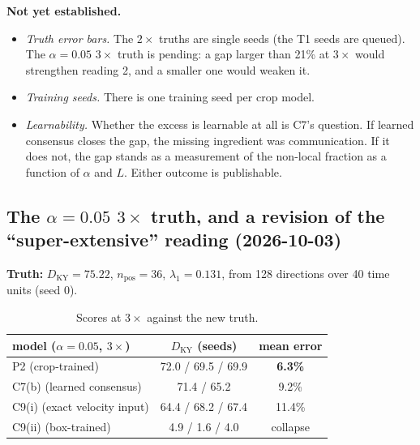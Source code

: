 \documentclass[11pt]{article}
\begin{document}
\textbf{Not yet established.}
\begin{itemize}[leftmargin=*]
\item \emph{Truth error bars.} The $2\times$ truths are single seeds (the
  T1 seeds are queued). The $\alpha{=}0.05$ $3\times$ truth is pending:
  a gap larger than 21\% at $3\times$ would strengthen reading 2, and a
  smaller one would weaken it.
\item \emph{Training seeds.} There is one training seed per crop model.
\item \emph{Learnability.} Whether the excess is learnable at all is C7's
  question. If learned consensus closes the gap, the missing ingredient
  was communication. If it does not, the gap stands as a measurement of
  the non-local fraction as a function of $\alpha$ and $L$. Either
  outcome is publishable.
\end{itemize}

\subsection{The $\alpha{=}0.05$ $3\times$ truth, and a revision of the ``super-extensive'' reading (2026-10-03)}
\label{sec:truth3_revision}

\textbf{Truth:} $D_{\mathrm{KY}}=75.22$, $n_{\mathrm{pos}}=36$,
$\lambda_1=0.131$, from 128 directions over 40 time units (seed 0).

\begin{table}[h]
\centering
\small
\begin{tabular}{lcc}
\toprule
model ($\alpha{=}0.05$, $3\times$) & $D_{\mathrm{KY}}$ (seeds) & mean error \\
\midrule
P2 (crop-trained) & 72.0 / 69.5 / 69.9 & \textbf{6.3\%} \\
C7(b) (learned consensus) & 71.4 / 65.2 & 9.2\% \\
C9(i) (exact velocity input) & 64.4 / 68.2 / 67.4 & 11.4\% \\
C9(ii) (box-trained) & 4.9 / 1.6 / 4.0 & collapse \\
\bottomrule
\end{tabular}
\caption{Scores at $3\times$ against the new truth.}
\label{tab:truth3}
\end{table}
\end{document}
